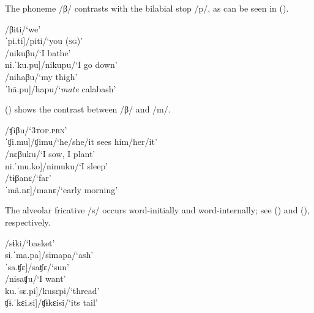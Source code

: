The phoneme /β/ contrasts with the bilabial stop /p/, as can be seen in ().
 
 \ea\label{ex:b-p}
\ea    \tab[ˈvi.ti]\tab\tab /βiti/\tab\tab ‘we’\\
   \tab{[}ˈpi.ti]\tab\tab /piti/\tab\tab ‘you (\textsc{sg})’\\
\ex    \tab[ni.ˈku.βu]\tab /nikuβu/\tab ‘I bathe’\\
   \tab{[}ni.ˈku.pu]\tab /nikupu/\tab ‘I go down’\\
\ex    \tab[ni.ˈhã.bo]\tab /nihaβu/\tab ‘my thigh’\\
   \tab{[}ˈhã.pu]\tab /hapu/\tab ‘\textit{mate} calabash’\\
\z
    \xe

() shows the contrast between /β/ and /m/.
 
 \ea\label{ex:b-m}
\ea    \tab[ˈʧi.βu]\tab /ʧiβu/\tab\tab ‘3\textsc{top.prn}’\\
   \tab{[}ˈʧi.mu]\tab /ʧimu/\tab ‘he/she/it sees him/her/it’\\
\ex    \tab[nɛ.ˈβu.ko]\tab /nɛβuku/\tab ‘I sow, I plant’\\
   \tab{[}ni.ˈmu.ko]\tab /nimuku/\tab ‘I sleep’\\
\ex    \tab[tɨ.ˈβa.nɛ]\tab /tɨβanɛ/\tab ‘far’\\
   \tab{[}ˈmã.nɛ]\tab /manɛ/\tab ‘early morning’\\%
\z
\xe
 

The alveolar fricative /s/ occurs word-initially and word-internally; see () and (), respectively.

\ea\label{ex:s}
\ea\label{ex:s.1}    \tab[ˈsɨ.ki]\tab\tab /sɨki/\tab\tab ‘basket’\\
   \tab{[}si.ˈma.pa]\tab /simapa/\tab ‘ash’\\
   \tab{[}ˈsa.ʧɛ]\tab /saʧɛ/\tab\tab ‘sun’\\
\ex\label{ex:s.2}    \tab[ni.ˈsa.ʧu]\tab /nisaʧu/\tab ‘I want’\\
   \tab{[}ku.ˈsɛ.pi]\tab /kusɛpi/\tab ‘thread’\\
   \tab{[}ʧɨ.ˈkɛi.si]\tab /ʧɨkɛisi/\tab ‘its tail’\\%
\z
\xe

